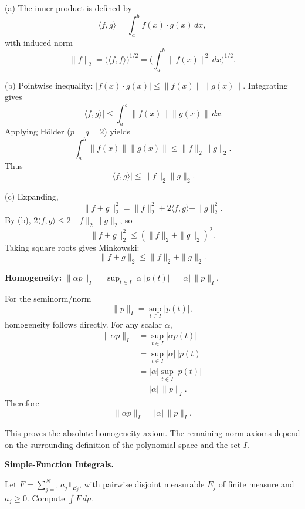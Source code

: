 \begin{solution}
(a) The inner product is defined by
	\[
	\langle f,g\rangle = \int_a^b f(x)\cdot g(x)\,dx,
	\]
	with induced norm
	\[
	\|f\|_2 = \big(\langle f,f\rangle\big)^{1/2}
	=\Big(\int_a^b \|f(x)\|^2\,dx\Big)^{1/2}.
	\]

	(b) Pointwise inequality: $|f(x)\cdot g(x)| \leq \|f(x)\|\|g(x)\|$.
	Integrating gives
	\[
	|\langle f,g\rangle| \leq \int_a^b \|f(x)\|\|g(x)\|\,dx.
	\]
	Applying Hölder ($p=q=2$) yields
	\[
	\int_a^b \|f(x)\|\|g(x)\| \leq \|f\|_2\|g\|_2.
	\]
	Thus
	\[
	|\langle f,g\rangle| \leq \|f\|_2\|g\|_2.
	\]

	(c) Expanding,
	\[
	\|f+g\|_2^2 = \|f\|_2^2 + 2\langle f,g\rangle + \|g\|_2^2.
	\]
	By (b), $2\langle f,g\rangle \leq 2\|f\|_2\|g\|_2$, so
	\[
	\|f+g\|_2^2 \leq (\|f\|_2+\|g\|_2)^2.
	\]
	Taking square roots gives Minkowski:
	\[
	\|f+g\|_2 \leq \|f\|_2+\|g\|_2.
	\]
\end{solution}

\begin{problem}[CP-II-0290]
\label{prob:cp-ii-0290}
\textbf{Homogeneity:} $\|\alpha p\|_{I}=\sup_{t\in I}|\alpha||p(t)|=|\alpha|\,\|p\|_{I}$.
\end{problem}

\begin{solution}
For the seminorm/norm
\[
\|p\|_I
=
\sup_{t\in I}|p(t)|,
\]
homogeneity follows directly. For any scalar \(\alpha\),
\[
\begin{aligned}
\|\alpha p\|_I
&=
\sup_{t\in I}|\alpha p(t)|\\
&=
\sup_{t\in I}
|\alpha|\,|p(t)|\\
&=
|\alpha|
\sup_{t\in I}|p(t)|\\
&=
|\alpha|\,\|p\|_I.
\end{aligned}
\]
Therefore
\[
\boxed{
\|\alpha p\|_I
=
|\alpha|\,\|p\|_I.
}
\]

This proves the absolute-homogeneity axiom. The remaining norm axioms depend on the
surrounding definition of the polynomial space and the set \(I\).
\end{solution}


\begin{problem}[CP-II-0292]
\label{prob:cp-ii-0292}
\textbf{Simple-Function Integrals.}

\hspace*{1.5em}Let \(F=\sum_{j=1}^N a_j\mathbf1_{E_j}\), with pairwise disjoint measurable \(E_j\) of finite measure and \(a_j\ge0\). Compute \(\int F\,d\mu\).
\end{problem}

